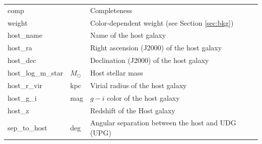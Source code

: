 \documentclass[twocolumn,astrosymb,twocolappendix,linenumbers]{aastex631}
\begin{document}
\begin{CJK*}{UTF8}{gbsn}
\begin{table}
\begin{center}
\begin{tabular}{l l l}
comp & & Completeness \\
weight & & Color-dependent weight (see Section \ref{sec:bkg}) \\
host\_name & & Name of the host galaxy \\
host\_ra & & Right ascension (J2000) of the host galaxy \\
host\_dec & & Declination (J2000) of the host galaxy \\
host\_log\_m\_star & $M_\odot$ & Host stellar mass\\
host\_r\_vir & kpc & Virial radius of the host galaxy \\
host\_g\_i & mag & $g-i$ color of the host galaxy \\
host\_z &  & Redshift of the Host galaxy \\
sep\_to\_host & deg & Angular separation between the host and UDG (UPG)\\
\hline\hline
\end{tabular}
\end{center}
\end{table}

\end{CJK*}
\end{document}
